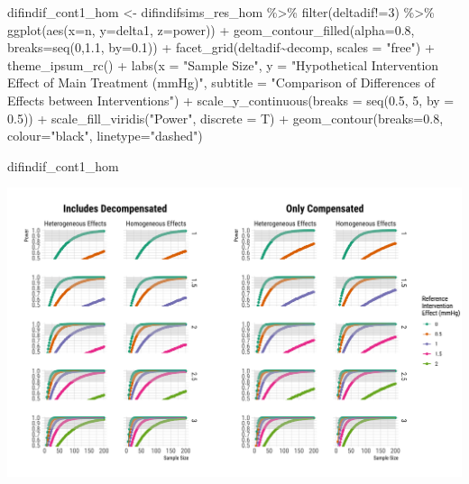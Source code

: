 \documentclass[
]{article}
\newenvironment{Shaded}{\begin{snugshade}}{\end{snugshade}}
\newcommand{\AttributeTok}[1]{\textcolor[rgb]{0.77,0.63,0.00}{#1}}
\newcommand{\DecValTok}[1]{\textcolor[rgb]{0.00,0.00,0.81}{#1}}
\newcommand{\FloatTok}[1]{\textcolor[rgb]{0.00,0.00,0.81}{#1}}
\newcommand{\FunctionTok}[1]{\textcolor[rgb]{0.00,0.00,0.00}{#1}}
\newcommand{\NormalTok}[1]{#1}
\newcommand{\OtherTok}[1]{\textcolor[rgb]{0.56,0.35,0.01}{#1}}
\newcommand{\SpecialCharTok}[1]{\textcolor[rgb]{0.00,0.00,0.00}{#1}}
\newcommand{\StringTok}[1]{\textcolor[rgb]{0.31,0.60,0.02}{#1}}
\begin{document}
\begin{Shaded}
\begin{Highlighting}[]
\NormalTok{difindif\_cont1\_hom }\OtherTok{\textless{}{-}}\NormalTok{ difindifsims\_res\_hom }\SpecialCharTok{\%\textgreater{}\%} 
  \FunctionTok{filter}\NormalTok{(deltadif}\SpecialCharTok{!=}\DecValTok{3}\NormalTok{) }\SpecialCharTok{\%\textgreater{}\%} 
  \FunctionTok{ggplot}\NormalTok{(}\FunctionTok{aes}\NormalTok{(}\AttributeTok{x=}\NormalTok{n, }\AttributeTok{y=}\NormalTok{delta1, }\AttributeTok{z=}\NormalTok{power)) }\SpecialCharTok{+}
  \FunctionTok{geom\_contour\_filled}\NormalTok{(}\AttributeTok{alpha=}\FloatTok{0.8}\NormalTok{, }\AttributeTok{breaks=}\FunctionTok{seq}\NormalTok{(}\DecValTok{0}\NormalTok{,}\FloatTok{1.1}\NormalTok{, }\AttributeTok{by=}\FloatTok{0.1}\NormalTok{)) }\SpecialCharTok{+}
  \FunctionTok{facet\_grid}\NormalTok{(deltadif}\SpecialCharTok{\textasciitilde{}}\NormalTok{decomp, }\AttributeTok{scales =} \StringTok{"free"}\NormalTok{) }\SpecialCharTok{+}
  \FunctionTok{theme\_ipsum\_rc}\NormalTok{() }\SpecialCharTok{+}
  \FunctionTok{labs}\NormalTok{(}\AttributeTok{x =} \StringTok{"Sample Size"}\NormalTok{,}
       \AttributeTok{y =} \StringTok{"Hypothetical Intervention Effect of Main Treatment (mmHg)"}\NormalTok{,}
       \AttributeTok{subtitle =} \StringTok{"Comparison of Differences of Effects between Interventions"}\NormalTok{) }\SpecialCharTok{+}
  \FunctionTok{scale\_y\_continuous}\NormalTok{(}\AttributeTok{breaks =} \FunctionTok{seq}\NormalTok{(}\FloatTok{0.5}\NormalTok{, }\DecValTok{5}\NormalTok{, }\AttributeTok{by =} \FloatTok{0.5}\NormalTok{)) }\SpecialCharTok{+}
  \FunctionTok{scale\_fill\_viridis}\NormalTok{(}\StringTok{"Power"}\NormalTok{, }\AttributeTok{discrete =}\NormalTok{ T) }\SpecialCharTok{+}
  \FunctionTok{geom\_contour}\NormalTok{(}\AttributeTok{breaks=}\FloatTok{0.8}\NormalTok{, }\AttributeTok{colour=}\StringTok{"black"}\NormalTok{, }\AttributeTok{linetype=}\StringTok{"dashed"}\NormalTok{)}

\NormalTok{difindif\_cont1\_hom}
\end{Highlighting}
\end{Shaded}

\includegraphics{figures/unnamed-chunk-76-1.png}
\end{document}
